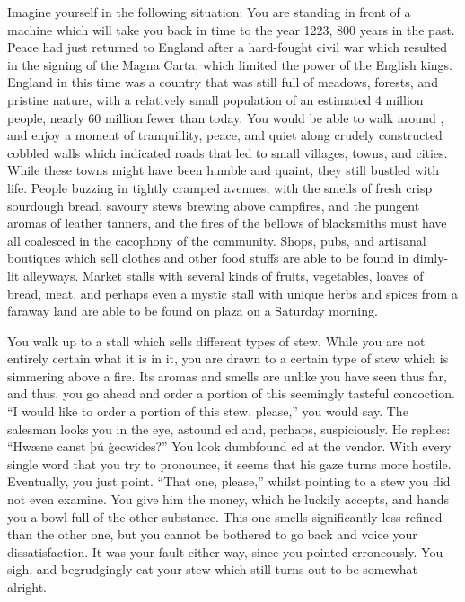 Imagine yourself in the following situation: You are standing in front of a machine which will take you back in time to the year 1223, 800 years in the past. Peace had just returned to England after a hard-fought civil war which resulted in the signing of the Magna Carta, which limited the power of the English kings. England in this time was a country that was still full of meadows, forests, and pristine nature, with a relatively small population of an estimated 4 million people, nearly 60 million fewer than today. You would be able to walk around , and enjoy a moment of tranquillity, peace, and quiet along crudely constructed cobbled walls which indicated roads that led to small villages, towns, and cities. While these towns might have been humble and quaint, they still bustled with life. People buzzing in tightly cramped avenues, with the smells of fresh crisp sourdough bread, savoury stews brewing above campfires, and the pungent aromas of leather tanners, and the fires of the bellows of blacksmiths must have all coalesced in the cacophony of the community. Shops, pubs, and artisanal boutiques which sell clothes and other food stuffs are able to be found  in dimly-lit alleyways. Market stalls with several kinds of fruits, vegetables, loaves of bread, meat, and perhaps even a mystic stall with unique herbs and spices from a faraway land are able to be found  on plaza on a Saturday morning. 

You walk up to a stall which sells different types of stew. While you are not entirely certain what it is in it, you are drawn to a certain type of stew which is simmering above a fire. Its aromas and smells are unlike you have seen thus far, and thus, you go ahead and order a portion of this seemingly tasteful concoction. “I would like to order a portion of this stew, please,” you would say. The salesman looks you in the eye, astound ed and, perhaps, suspiciously. He replies: “Hwæne canst þú ġecwides?” You look dumbfound ed at the vendor. With every single word that you try to pronounce, it seems that his gaze turns more hostile. Eventually, you just point. “That one, please,” whilst pointing to a stew you did not even examine. You give him the money, which he luckily accepts, and hands you a bowl full of the other substance. This one smells significantly less refined than the other one, but you cannot be bothered to go back and voice your dissatisfaction. It was your fault either way, since you pointed erroneously. You sigh, and begrudgingly eat your stew which still turns out to be somewhat alright. 

